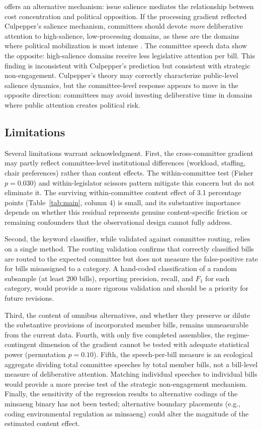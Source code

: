 \documentclass[11pt]{article}
\begin{document}
\citet{culpepper2011} offers an alternative mechanism: issue salience mediates the relationship between cost concentration and political opposition. If the processing gradient reflected Culpepper's salience mechanism, committees should devote \emph{more} deliberative attention to high-salience, low-processing domains, as these are the domains where political mobilization is most intense \citep[see also][]{smith1999, braun2020}. The committee speech data show the opposite: high-salience domains receive less legislative attention per bill. This finding is inconsistent with Culpepper's prediction but consistent with strategic non-engagement. Culpepper's theory may correctly characterize public-level salience dynamics, but the committee-level response appears to move in the opposite direction: committees may avoid investing deliberative time in domains where public attention creates political risk.

\subsection{Limitations}

Several limitations warrant acknowledgment. First, the cross-committee gradient may partly reflect committee-level institutional differences (workload, staffing, chair preferences) rather than content effects. The within-committee test (Fisher $p = 0.030$) and within-legislator scissors pattern mitigate this concern but do not eliminate it. The surviving within-committee content effect of 3.1 percentage points (Table~\ref{tab:main}, column 4) is small, and its substantive importance depends on whether this residual represents genuine content-specific friction or remaining confounders that the observational design cannot fully address.

Second, the keyword classifier, while validated against committee routing, relies on a single method. The routing validation confirms that correctly classified bills are routed to the expected committee but does not measure the false-positive rate for bills misassigned to a category. A hand-coded classification of a random subsample (at least 200 bills), reporting precision, recall, and $F_1$ for each category, would provide a more rigorous validation and should be a priority for future revisions.

Third, the content of omnibus alternatives, and whether they preserve or dilute the substantive provisions of incorporated member bills, remains unmeasurable from the current data. Fourth, with only five completed assemblies, the regime-contingent dimension of the gradient cannot be tested with adequate statistical power (permutation $p = 0.10$). Fifth, the speech-per-bill measure is an ecological aggregate dividing total committee speeches by total member bills, not a bill-level measure of deliberative attention. Matching individual speeches to individual bills would provide a more precise test of the strategic non-engagement mechanism. Finally, the sensitivity of the regression results to alternative codings of the minsaeng binary has not been tested; alternative boundary placements (e.g., coding environmental regulation as minsaeng) could alter the magnitude of the estimated content effect.
\end{document}
